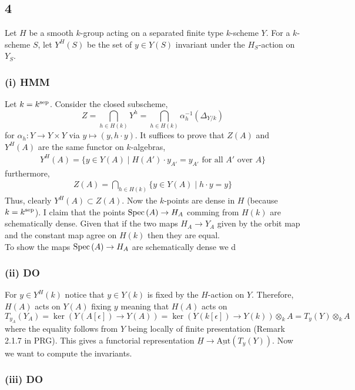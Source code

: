 \documentclass[12pt]{article}
\begin{document}
\subsection{4}

Let $H$ be a smooth $k$-group acting on a separated finite type $k$-scheme $Y$. For a $k$-scheme $S$, let $Y^H(S)$ be the set of $y \in Y(S)$ invariant under the $H_S$-action on $Y_S$. 

\subsubsection{(i) HMM}

Let $k = k^{\mathrm{sep}}$. Consider the closed subscheme,
\[ Z = \bigcap_{h \in H(k)} Y^h = \bigcap_{h \in H(k)} \alpha_h^{-1}(\Delta_{Y/k}) \]
for $\alpha_h : Y \to Y \times Y$ via $y \mapsto (y, h \cdot y)$. It suffices to prove that $Z(A)$ and $Y^H(A)$ are the same functor on $k$-algebras,
\begin{align*}
Y^H(A) = \{ y \in Y(A) \mid H(A') \cdot y_{A'} = y_{A'} \text{ for all } A' \text{ over } A \} 
\end{align*}
furthermore,
\begin{align*}
Z(A) = \bigcap_{h \in H(k)} \{ y \in Y(A) \mid h \cdot y = y \} 
\end{align*}
Thus, clearly $Y^H(A) \subset Z(A)$. Now the $k$-points are dense in $H$ (because $k = k^{\mathrm{sep}}$). I claim that the points $\mathrm{Spec}\left( A \right) \to H_A$ comming from $H(k)$ are schematically dense. Given that if the two maps $H_A \to Y_A$ given by the orbit map and the constant map agree on $H(k)$ then they are equal.
\bigskip\\
To show the maps $\mathrm{Spec}\left( A \right) \to H_A$ are schematically dense we d  

\subsubsection{(ii) DO}

For $y \in Y^H(k)$ notice that $y \in Y(k)$ is fixed by the $H$-action on $Y$. Therefore, $H(A)$ acts on $Y(A)$ fixing $y$ meaning that $H(A)$ acts on 
\[ T_{y_A}(Y_A) = \ker{(Y(A[\epsilon]) \to Y(A))} = \ker{(Y(k[\epsilon]) \to Y(k))} \otimes_k A = T_y(Y) \otimes_k A \]
where the equality follows from $Y$ being locally of finite presentation (Remark 2.1.7 in PRG). This gives a functorial representation $\underline{H} \to \underline{\mathrm{Aut}}(T_y(Y))$. Now we want to compute the invariants. 

\subsubsection{(iii) DO}
\end{document}

